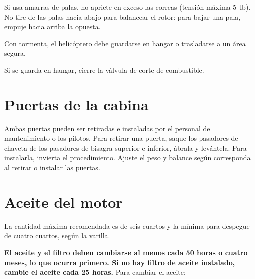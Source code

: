 \begin{precaucion}
Si usa amarras de palas, no apriete en exceso las correas (tensión máxima 5~lb). No tire de las palas hacia abajo para balancear el rotor: para bajar una pala, empuje hacia arriba la opuesta.
\end{precaucion}

\begin{pasos}
\setcounter{enumi}{3}
\item Con tormenta, el helicóptero debe guardarse en hangar o trasladarse a un área segura.
\item Si se guarda en hangar, cierre la válvula de corte de combustible.
\end{pasos}

\section{Puertas de la cabina}

Ambas puertas pueden ser retiradas e instaladas por el personal de mantenimiento o los pilotos. Para retirar una puerta, saque los pasadores de chaveta de los pasadores de bisagra superior e inferior, ábrala y levántela. Para instalarla, invierta el procedimiento. Ajuste el peso y balance según corresponda al retirar o instalar las puertas.

\section{Aceite del motor}

La cantidad máxima recomendada es de seis cuartos y la mínima para despegue de cuatro cuartos, según la varilla.

\textbf{El aceite y el filtro deben cambiarse al menos cada 50 horas o cuatro meses, lo que ocurra primero. Si no hay filtro de aceite instalado, cambie el aceite cada 25 horas.} Para cambiar el aceite:

